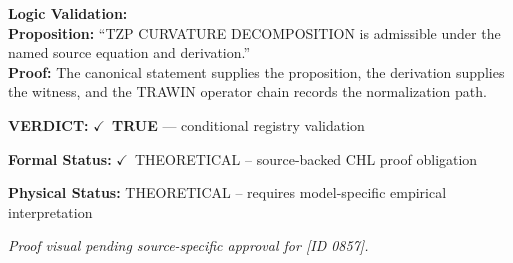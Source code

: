\textbf{Logic Validation:}\\
\textbf{Proposition:} ``TZP CURVATURE DECOMPOSITION is admissible under the named source equation and derivation.''\\
\textbf{Proof:} The canonical statement supplies the proposition, the derivation supplies the witness, and the TRAWIN operator chain records the normalization path.

\textbf{VERDICT:} \ensuremath{\checkmark}\ \textbf{TRUE} --- conditional registry validation

\textbf{Formal Status:} \ensuremath{\checkmark}\ THEORETICAL -- source-backed CHL proof obligation

\textbf{Physical Status:} THEORETICAL -- requires model-specific empirical interpretation
\par\vspace{0.45em}
\par
\vfill
\begingroup\footnotesize\itshape
Proof visual pending source-specific approval for [ID 0857].
\par\endgroup
\vfill
\endgroup
\endgroup
